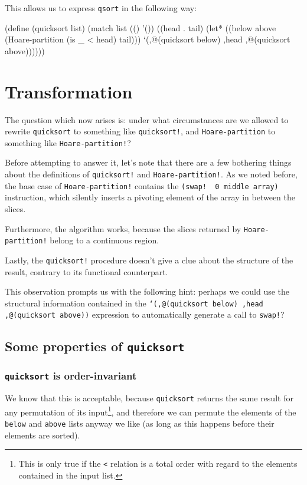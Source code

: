 This allows us to express \texttt{qsort} in the following way:

\begin{Snippet}
(define (quicksort list)
  (match list
    (()
     '())
    ((head . tail)
     (let* ((below above (Hoare-partition (is _ < head) tail)))
       `(,@(quicksort below) ,head ,@(quicksort above))))))
\end{Snippet}

\section{Transformation}

The question which now arises is: under what circumstances are we allowed
to rewrite \texttt{quicksort} to something like \texttt{quicksort!},
and \texttt{Hoare\--partition} to something like \texttt{Hoare-partition!}?

Before attempting to answer it, let's note that there are a few bothering
things about the definitions of \texttt{quicksort!}\,\,and
\texttt{Hoare\--partition!}. As we noted before, the base case of
\texttt{Hoare\--partition!}\,\,contains the \texttt{(swap!\,\,0 middle array)}
instruction, which silently inserts a pivoting element of the array
in between the slices.

Furthermore, the algorithm works, because the slices returned by
\texttt{Hoare\--partition!} belong to a continuous region.

Lastly, the \texttt{quicksort!} procedure doesn't give a clue
about the structure of the result, contrary to its functional
counterpart.

This observation prompts us with the following hint: perhaps we could use the
structural information contained in the \texttt{`(,@(quicksort below)
  ,head ,@(quicksort above))} expression to automatically generate a call to
\texttt{swap!}?

\subsection{Some properties of \texttt{quicksort}}

\subsubsection{\texttt{quicksort} is order-invariant}

We know that this is acceptable, because \texttt{quicksort} returns
the same result for any permutation of its input\footnote{This is
  only true if the \texttt{<} relation is a total order with regard to the
  elements contained in the input list.}, and therefore we can permute
the elements of the \texttt{below} and \texttt{above} lists anyway we
like (as long as this happens before their elements are sorted).

